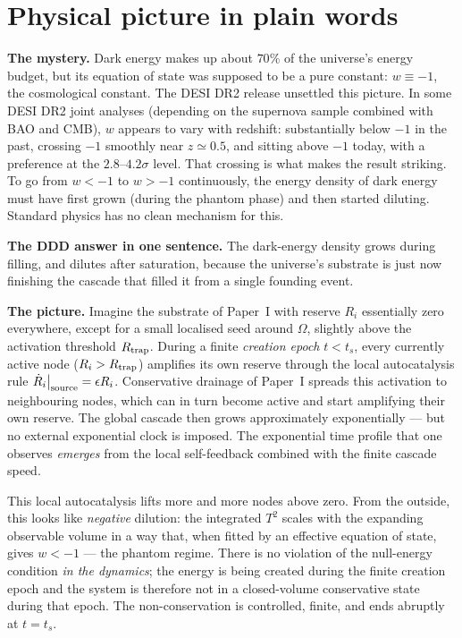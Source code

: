 \documentclass[11pt,a4paper]{article}
\begin{document}
\section{Physical picture in plain words}
\label{sec:picture}

\textbf{The mystery.} Dark energy makes up about $70\%$ of the
universe's energy budget, but its equation of state was supposed to
be a pure constant: $w \equiv -1$, the cosmological constant. The
DESI DR2 release unsettled this picture. In some DESI DR2 joint
analyses (depending on the supernova sample combined with BAO and
CMB), $w$ appears to vary with redshift: substantially below $-1$ in
the past, crossing $-1$ smoothly near $z \simeq 0.5$, and sitting
above $-1$ today, with a preference at the $2.8$--$4.2\sigma$ level.
That crossing is what makes the result striking. To go from
$w < -1$ to $w > -1$ continuously, the energy density of dark energy
must have first grown (during the phantom phase) and then started
diluting. Standard physics has no clean mechanism for this.

\textbf{The DDD answer in one sentence.} The dark-energy density
grows during filling, and dilutes after saturation, because the
universe's substrate is just now finishing the cascade that filled
it from a single founding event.

\textbf{The picture.} Imagine the substrate of Paper~I with reserve
$R_i$ essentially zero everywhere, except for a small localised seed
around $\Omega$, slightly above the activation threshold
$R_{\rm trap}$. During a finite \emph{creation epoch} $t < t_s$, every
currently active node ($R_i > R_{\rm trap}$) amplifies its own reserve
through the local autocatalysis rule
$\dot R_i\big|_{\rm source} = \epsilon R_i$. Conservative drainage of
Paper~I spreads this activation to neighbouring nodes, which can in
turn become active and start amplifying their own reserve.
The global cascade then grows approximately exponentially --- but no
external exponential clock is imposed. The exponential time
profile that one observes \emph{emerges} from the local self-feedback
combined with the finite cascade speed.

This local autocatalysis lifts more and more nodes above zero. From
the outside, this looks like \emph{negative} dilution: the integrated
$T^2$ scales with the expanding observable volume in a way that, when
fitted by an effective equation of state, gives $w < -1$ --- the
phantom regime. There is no violation of the null-energy condition
\emph{in the dynamics}; the energy is being created during the finite
creation epoch and the system is therefore not in a closed-volume
conservative state during that epoch. The non-conservation is
controlled, finite, and ends abruptly at $t = t_s$.
\end{document}
